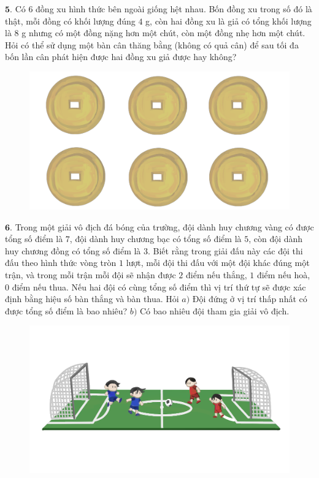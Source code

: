 \begin{multicols}{2}
\begin{figure}[H]
		\vspace*{-10pt}
	\end{figure}
	\vskip 0.1cm
	$\pmb{5.}$ 	Có $6$ đồng xu hình thức bên ngoài giống hệt nhau. Bốn đồng xu trong số đó là thật, mỗi đồng có khối lượng đúng $4$ g, còn hai đồng xu là giả có tổng khối lượng là $8$ g nhưng có một đồng nặng hơn một chút, còn một đồng nhẹ hơn một chút. Hỏi có thể sử dụng một bàn cân thăng bằng (không có quả cân) để sau tối đa bốn lần cân phát hiện được hai đồng xu giả được hay không?
	\begin{figure}[H]
		\centering
		\vspace*{-5pt}
		\captionsetup{labelformat= empty, justification=centering}
		\includegraphics[width=1\linewidth]{Hinh5}
		\vspace*{-20pt}
	\end{figure}
	$\pmb{6.}$ 	Trong một giải vô địch đá bóng của trường, đội dành huy chương vàng có được tổng số điểm là $7$, đội dành huy chương bạc có tổng số điểm là $5$, còn đội dành huy chương đồng có tổng số điểm là $3$. Biết rằng trong giải đấu này các đội thi đấu theo hình thức vòng tròn $1$ lượt, mỗi đội thi đấu với một đội khác đúng một trận, và trong mỗi trận mỗi đội sẽ nhận được $2$ điểm nếu thắng, $1$ điểm nếu hoà, $0$ điểm nếu thua. Nếu hai đội có cùng tổng số điểm thì vị trí thứ tự sẽ được xác định bằng hiệu số bàn thắng và bàn thua. Hỏi 
	\vskip 0.1cm
	$a)$ Đội đứng ở vị trí thấp nhất có được tổng số điểm là bao nhiêu?
	\vskip 0.1cm
	$b)$	Có bao nhiêu đội tham gia giải vô địch.
	\begin{figure}[H]
		\centering
		\vspace*{-10pt}
		\captionsetup{labelformat= empty, justification=centering}
		\includegraphics[width=1\linewidth]{Hinh6}
		\vspace*{-10pt}
	\end{figure}
\end{multicols}
